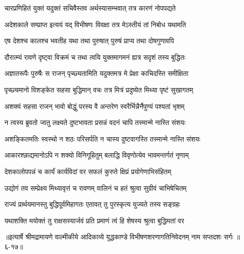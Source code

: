 \twolineshloka
{चारप्रणिहितं युक्तं यदुक्तं सचिवैस्तव}
{अर्थस्यासम्भवात् तत्र कारणं नोपपद्यते} %

\twolineshloka
{अदेशकाले सम्प्राप्त इत्ययं यद् विभीषणः}
{विवक्षा तत्र मेऽस्तीयं तां निबोध यथामति} %

\twolineshloka
{एष देशश्च कालश्च भवतीह यथा तथा}
{पुरुषात् पुरुषं प्राप्य तथा दोषगुणावपि} %

\twolineshloka
{दौरात्म्यं रावणे दृष्ट्वा विक्रमं च तथा त्वयि}
{युक्तमागमनं ह्यत्र सदृशं तस्य बुद्धितः} %

\twolineshloka
{अज्ञातरूपैः पुरुषैः स राजन् पृच्छ्यतामिति}
{यदुक्तमत्र मे प्रेक्षा काचिदस्ति समीक्षिता} %

\twolineshloka
{पृच्छ्यमानो विशङ्केत सहसा बुद्धिमान् वचः}
{तत्र मित्रं प्रदुष्येत मिथ्या पृष्टं सुखागतम्} %

\twolineshloka
{अशक्यं सहसा राजन् भावो बोद्धुं परस्य वै}
{अन्तरेण स्वरैर्भिन्नैर्नैपुण्यं पश्यतां भृशम्} %

\twolineshloka
{न त्वस्य ब्रुवतो जातु लक्ष्यते दुष्टभावता}
{प्रसन्नं वदनं चापि तस्मान्मे नास्ति संशयः} %

\twolineshloka
{अशङ्कितमतिः स्वस्थो न शठः परिसर्पति}
{न चास्य दुष्टवागस्ति तस्मान्मे नास्ति संशयः} %

\twolineshloka
{आकारश्छाद्यमानोऽपि न शक्यो विनिगूहितुम्}
{बलाद्धि विवृणोत्येव भावमन्तर्गतं नृणाम्} %

\twolineshloka
{देशकालोपपन्नं च कार्यं कार्यविदां वर}
{सफलं कुरुते क्षिप्रं प्रयोगेणाभिसंहितम्} %

\twolineshloka
{उद्योगं तव सम्प्रेक्ष्य मिथ्यावृत्तं च रावणम्}
{वालिनं च हतं श्रुत्वा सुग्रीवं चाभिषेचितम्} %

\twolineshloka
{राज्यं प्रार्थयमानस्तु बुद्धिपूर्वमिहागतः}
{एतावत् तु पुरस्कृत्य युज्यते तस्य सङ्ग्रहः} %

\twolineshloka
{यथाशक्ति मयोक्तं तु राक्षसस्यार्जवं प्रति}
{प्रमाणं त्वं हि शेषस्य श्रुत्वा बुद्धिमतां वर} %


॥इत्यार्षे श्रीमद्रामायणे वाल्मीकीये आदिकाव्ये युद्धकाण्डे विभीषणशरणागतिनिवेदनम् नाम सप्तदशः सर्गः ॥६-१७॥
